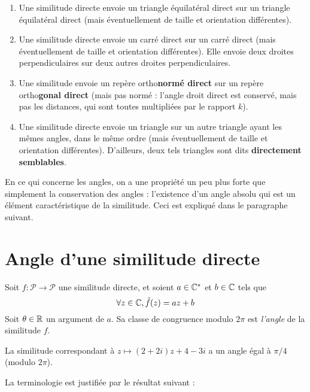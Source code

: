 \begin{exemples}
\begin{enumerate}
\item Une similitude directe envoie un triangle équilatéral direct sur un triangle équilatéral direct (mais éventuellement de taille et orientation différentes).
\item Une similitude directe envoie un carré direct sur un carré direct (mais éventuellement de taille et orientation différentes). Elle envoie deux droites perpendiculaires sur deux autres droites perpendiculaires.
\item Une similitude envoie un repère ortho\textbf{normé direct} sur un repère ortho\textbf{gonal direct} (mais pas normé : l'angle droit direct est conservé, mais pas les distances, qui sont toutes multipliées par le rapport $k$).
\item Une similitude directe envoie un triangle sur un autre triangle ayant les mêmes angles, dans le même ordre (mais éventuellement de taille et orientation différentes). D'ailleurs, deux tels triangles sont dits \textbf{directement semblables}.
\end{enumerate}
\end{exemples}
En ce qui concerne les angles, on a une propriété un peu plus forte que simplement la conservation des angles : l'existence d'un angle absolu qui est un élément caractéristique de la similitude. Ceci est expliqué dans le paragraphe suivant.


\section{Angle d'une similitude directe}

\begin{definition}
Soit $f :\mathcal P\to \mathcal P$ une similitude directe, et soient $a\in\mathbb{C}^*$ et $b\in\mathbb{C}$ tels que 
\[ \forall z\in\mathbb{C}, \tilde f (z) = az+b\]
Soit $\theta\in\mathbb{R}$ un argument de $a$. Sa classe de congruence modulo $2\pi$ est \emph{l'angle} de la similitude $f$.
\end{definition}

\begin{exemple}
La similitude correspondant à $z\mapsto (2+2i)z+4-3i$ a un angle égal à  $\pi/4$ (modulo $2\pi$). 
\end{exemple}

La terminologie est justifiée par le résultat suivant :

